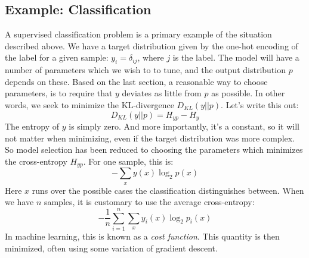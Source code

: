 \documentclass[12pt, a4paper]{article}
\numberwithin{equation}{section}
\begin{document}
\subsection{Example: Classification}
A supervised classification problem is a primary example of the situation described above. We have a target distribution given by the one-hot encoding of the label for a given sample: $y_i=\delta_{ij}$, where $j$ is the label. The model will have a number of parameters which we wish to to tune, and the output distribution $p$ depends on these. Based on the last section, a reasonable way to choose parameters, is to require that $y$ deviates as little from $p$ as possible. In other words, we seek to minimize the KL-divergence $D_{KL}(y||p)$. Let's write this out:
\begin{equation}
D_{KL}(y||p)=H_{yp}-H_y
\end{equation}
The entropy of $y$ is simply zero. And more importantly, it's a constant, so it will not matter when minimizing, even if the target distribution was more complex. So model selection has been reduced to choosing the parameters which minimizes the cross-entropy $H_{yp}$. For one sample, this is:
\begin{equation}
-\sum_x y(x)\log_2 p(x)
\end{equation}
Here $x$ runs over the possible cases the classification distinguishes between. When we have $n$ samples, it is customary to use the average cross-entropy:
\begin{equation}
-\frac{1}{n}\sum_{i=1}^n\sum_x y_i(x)\log_2 p_i(x)
\end{equation}
In machine learning, this is known as a \textit{cost function}. This quantity is then minimized, often using some variation of gradient descent.
\end{document}
